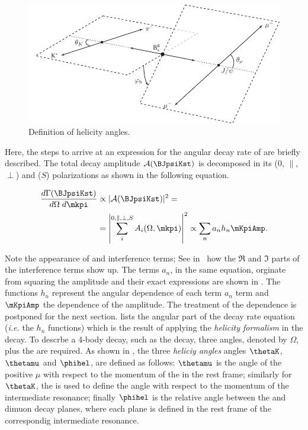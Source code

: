 \begin{figure}[t]
  \centering
  \includegraphics[width=\textwidth]{Figures/Chapter4/helAngles.pdf}
  \caption{Definition of helicity angles.}
  \label{helAngles}
\end{figure}

Here, the steps to arrive at an expression for the angular decay rate of \BsJpsiKst are briefly described.
The total decay amplitude $\mathcal{A}(\text{\BJpsiKst})$ is decomposed in its \pwave ($0$, $\parallel$, $\perp$)
and \swave ($S$) polarizations as shown in the following equation.

\begin{align}
  \centering
  \frac{d\Gamma(\text{\BJpsiKst})}{d\Omega\;d\mkpi} &\propto |\mathcal{A}(\text{\BJpsiKst})|^2 = \nonumber \\
                                                    &= \left| \sum_i^{0,\parallel,\perp,S} A_i(\Omega,\mkpi) \right|^2  \propto \sum_n a_n h_n \mKpiAmp.
  \label{ang_terms}
\end{align}

\noindent Note the appearance of \pwave and \spwave interference terms; See in~\cite{jeroenThesis} how the $\Re$
and $\Im$ parts of the interference terms show up. The terms $a_n$, in the same equation,
orginate from squaring the amplitude and their exact expressions are shown in .
The functions $h_n$ represent the angular dependence of each term $a_n$ term and $\mKpiAmp$ the \mkpi dependence of
the amplitude. The treatment of the \mkpi dependence is postponed for the next section.  lists the angular
part of the decay rate equation ({\it i.e.} the $h_n$ functions) which is the result of
applying the \emph{helicity formalism} in the \BJpsiKst decay. To descrbe a 4-body decay, such as the \BJpsiKst decay, three
angles, denoted by $\Omega$, plus the \mkpi are required. As shown in , the three \emph{heliciy angles} angles
$\thetaK$, $\thetamu$ and $\phihel$, are defined as follows: $\thetamu$ is the angle of the positive $\mu$ with respect to the
momentum of the \jpsi in the \Bs rest frame; similarly for $\thetaK$, the \kaon is used to define the angle with respect to
the momentum of the intermediate \Kpi resonance; finally $\phihel$ is the relative angle between the \Kpi and dimuon decay
planes, where each plane is defined in the rest frame of the correspondig intermediate resonance.

